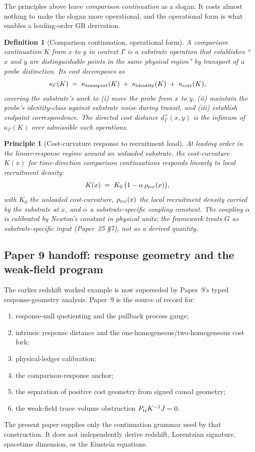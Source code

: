 \documentclass[11pt]{article}
\newtheorem{definition}[theorem]{Definition}
\newtheorem{principle}[theorem]{Principle}
\theoremstyle{remark}
\newcommand{\G}{\Gamma}
\newcommand{\Cost}{\kappa}
\begin{document}
The principles above leave \emph{comparison continuation} as a slogan.  It costs almost nothing to make the slogan more operational, and the operational form is what enables a leading-order GR derivation.

\begin{definition}[Comparison continuation, operational form]
A comparison continuation $K$ from $x$ to $y$ in context $\G$ is a substrate operation that establishes ``$x$ and $y$ are distinguishable points in the same physical region'' by transport of a probe distinction.  Its cost decomposes as
\[
        \Cost_\G(K) \;=\; \Cost_{\rm transport}(K) \;+\; \Cost_{\rm identity}(K) \;+\; \Cost_{\rm corr}(K),
\]
covering the substrate's work to (i) move the probe from $x$ to $y$, (ii) maintain the probe's identity-class against substrate noise during transit, and (iii) establish endpoint correspondence.  The directed cost distance $d^+_\G(x,y)$ is the infimum of $\Cost_\G(K)$ over admissible such operations.
\end{definition}

\begin{principle}[Cost-curvature response to recruitment load]
At leading order in the linear-response regime around an unloaded substrate, the cost-curvature $K(x)$ for time-direction comparison continuations responds linearly to local recruitment density:
\[
        K(x) \;=\; K_0\,\big(1 - \alpha\,\rho_{\rm rec}(x)\big),
\]
with $K_0$ the unloaded cost-curvature, $\rho_{\rm rec}(x)$ the local recruitment density carried by the substrate at $x$, and $\alpha$ a substrate-specific coupling constant.  The coupling $\alpha$ is calibrated by Newton's constant in physical units; the framework treats $G$ as substrate-specific input (Paper~25 \S 7), not as a derived quantity.
\end{principle}

\subsection{Paper 9 handoff: response geometry and the weak-field program}

The earlier redshift worked example is now superseded by Paper~9's typed response-geometry analysis.  Paper~9 is the source of record for:
\begin{enumerate}
\item response-null quotienting and the pullback process gauge;
\item intrinsic response distance and the one-homogeneous/two-homogeneous cost fork;
\item physical-ledger calibration;
\item the comparison-response anchor;
\item the separation of positive cost geometry from signed causal geometry;
\item the weak-field trace--volume obstruction \(P_{\rm tr}K^{-1}J=0\).
\end{enumerate}
The present paper supplies only the continuation grammar used by that construction.  It does not independently derive redshift, Lorentzian signature, spacetime dimension, or the Einstein equations.
\end{document}
